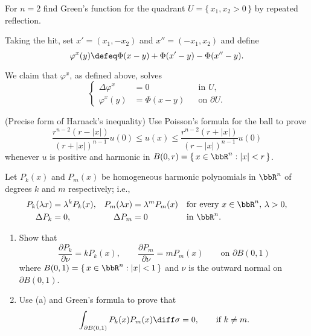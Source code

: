 \begin{problem}
  For \(n=2\) find Green's function for the quadrant
  \(U=\{\,x_1,x_2>0\,\}\) by repeated reflection.
\end{problem}
\begin{solution}
  Taking the hit, set \(x'=(x_1,-x_2)\) and \(x''=(-x_1,x_2)\) and define
  \begin{equation}
    \label{eq:6:corrector}
    \varphi^x(y)\defeq \Phi(x-y)+\Phi(x'-y)-\Phi(x''-y).
  \end{equation}

  We claim that \(\varphi^x\), as defined above, solves
  \[
    \left\{
      \begin{aligned}
        \Delta\varphi^x&=0&&\text{in \(U\),}\\
        \varphi^x(y)&=\Phi(x-y)&&\text{on \(\partial U\).}
      \end{aligned}
    \right.
  \]
\end{solution}
\newpage

\begin{problem}
  (Precise form of Harnack's inequality) Use Poisson's formula for the ball
  to prove
  \[
    \frac{r^{n-2}(r-|x|)}{(r+|x|)^{n-1}}u(0)%
    \leq u(x)%
    \leq \frac{r^{n-2}(r+|x|)}{(r-|x|)^{n-1}}u(0)
  \]
  whenever \(u\) is positive and harmonic in
  \(B(0,r)=\{\,x\in\bbR^n:|x|<r\,\}\).
\end{problem}
\begin{solution}
\end{solution}
\newpage

\begin{problem}
  Let \(P_k(x)\) and \(P_m(x)\) be homogeneous harmonic polynomials in
  \(\bbR^n\) of degrees \(k\) and \(m\) respectively; i.e.,
  \begin{align*}
    P_k(\lambda x)&=\lambda^k P_k(x),&P_m(\lambda x)&=\lambda^m P_m(x)
    &&\text{for every \(x\in\bbR^n\), \(\lambda>0\),}\\
    \Delta P_k&=0,&\Delta P_m&=0&&\text{in \(\bbR^n\).}
  \end{align*}
  \begin{enumerate}[label=(\alph*),noitemsep]
  \item Show that
    \[
      \frac{\partial P_k}{\partial \nu}=kP_k(x),\qquad
      \frac{\partial P_m}{\partial\nu}=mP_m(x)\qquad\text{on \(\partial B(0,1)\)}
    \]
    where \(B(0,1)=\{\,x\in\bbR^n:|x|<1\,\}\) and \(\nu\) is the outward
    normal on \(\partial B(0,1)\).
  \item Use (a) and Green's formula to prove that
    \[
      \int_{\partial B(0,1)}P_k(x)P_m(x)\diff\sigma=0,\qquad\text{if
        \(k\neq m\).}
    \]
  \end{enumerate}
\end{problem}
\begin{solution}
\end{solution}

